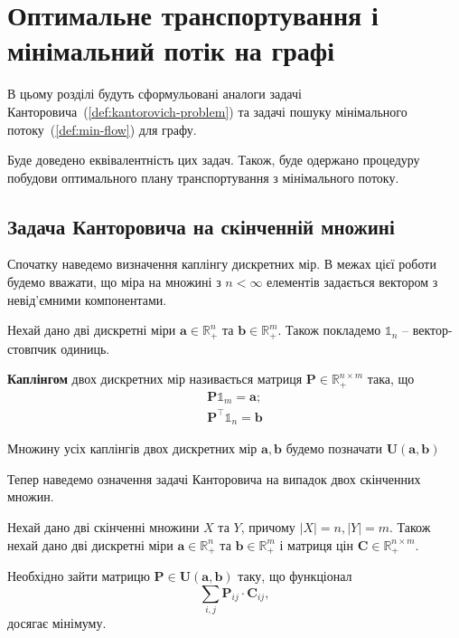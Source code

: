 \chapter{Оптимальне транспортування і мінімальний потік на графі}
\label{chap:graph}

В цьому розділі будуть сформульовані аналоги задачі Канторовича~(\ref{def:kantorovich-problem})
та задачі пошуку мінімального потоку~(\ref{def:min-flow}) для графу.

Буде доведено еквівалентність цих задач. Також, буде одержано процедуру побудови
оптимального плану транспортування з мінімального потоку.

\section{Задача Канторовича на скінченній множині}
Спочатку наведемо визначення каплінгу дискретних мір. В межах цієї роботи будемо вважати,
що міра на множині з $n < \infty$ елементів задається вектором з невід'ємними компонентами.

\begin{definition}
    Нехай дано дві дискретні міри $\mathbf a \in \mathbb{R}_+^n$ та $\mathbf b \in \mathbb{R}_+^m$. Також покладемо
    $\mathbb{1}_n$ -- вектор-стовпчик одиниць.

    \textbf{Каплінгом} двох дискретних мір називається матриця $\mathbf{P} \in \mathbb{R}_{+}^{n \times m}$ така, що
    \begin{eqnarray*}
        \mathbf{P}\mathbb{1}_m = \mathbf a; \\
        \mathbf{P}^\top \mathbb{1}_n = \mathbf b
    \end{eqnarray*}
\end{definition}

Множину усіх каплінгів двох дискретних мір $\mathbf a, \mathbf b$ будемо позначати $\mathbf{U}\left(\mathbf a, \mathbf b\right)$

Тепер наведемо означення задачі Канторовича на випадок двох скінченних множин.

\begin{definition}
    \label{def:kantorovich-problem-d}
    Нехай дано дві скінченні множини $X$ та $Y$, причому $|X| = n, |Y| = m$. Також нехай дано дві дискретні міри
    $\mathbf a \in \mathbb{R}_+^n$ та $\mathbf b \in \mathbb{R}_+^m$ і матриця цін $\mathbf{C} \in \mathbb{R}_+^{n \times m}$.

    Необхідно зайти матрицю $\mathbf{P} \in \mathbf{U}\left(\mathbf a, \mathbf b\right)$ таку, що функціонал
    $$
        \sum_{i, j} \mathbf{P}_{ij} \cdot \mathbf{C}_{ij},
    $$
    досягає мінімуму.
\end{definition}

